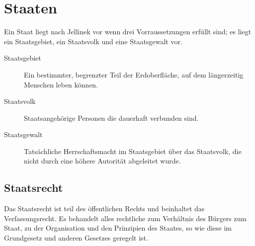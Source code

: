 \documentclass{article}
\begin{document}
\section{Staaten}
Ein Staat liegt nach Jellinek vor wenn drei Vorraussetzungen erfüllt sind; es liegt ein Staatsgebiet, ein Staatsvolk und eine Staatsgewalt vor.
\begin{description}
 \item[Staatsgebiet] Ein bestimmter, begrenzter Teil der Erdoberfläche, auf dem längerzeitig Menschen leben können.
 \item[Staatsvolk] Staatsangehörige Personen die dauerhaft verbunden sind.
 \item[Staatsgewalt] Tatsächliche Herrschaftsmacht im Staatsgebiet über das Staatsvolk, die nicht durch eine höhere Autorität abgeleitet wurde.
\end{description} 


\subsection{Staatsrecht}
Das Staatsrecht ist teil des öffentlichen Rechts und beinhaltet das Verfassungsrecht. Es behandelt alles rechtliche zum Verhältnis des Bürgers zum Staat, zu der Organisation und den Prinzipien des Staates, so wie diese im Grundgesetz und anderen Gesetzes geregelt ist.

\end{document}
